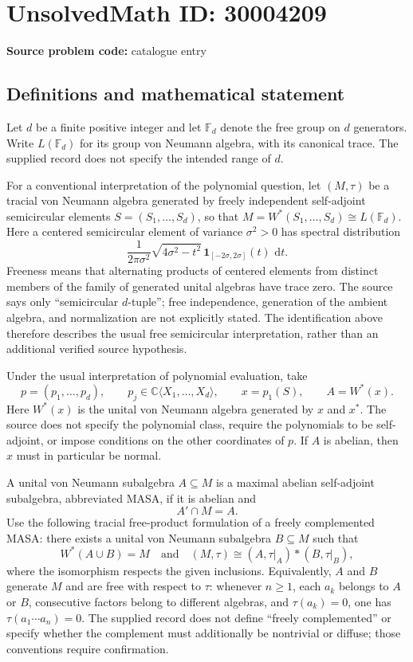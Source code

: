 \documentclass[11pt]{article}
\newcommand{\C}{\mathbb{C}}
\newcommand{\dd}{\,\mathrm{d}}
\begin{document}
\section*{UnsolvedMath ID: 30004209}
\textbf{Source problem code:} catalogue entry
\subsection{Definitions and mathematical statement}
Let \(d\) be a finite positive integer and let \(\mathbb F_d\) denote the free group on \(d\) generators. Write \(L(\mathbb F_d)\) for its group von Neumann algebra, with its canonical trace. The supplied record does not specify the intended range of \(d\).

For a conventional interpretation of the polynomial question, let \((M,\tau)\) be a tracial von Neumann algebra generated by freely independent self-adjoint semicircular elements \(S=(S_1,\ldots,S_d)\), so that \(M=W^*(S_1,\ldots,S_d)\cong L(\mathbb F_d)\). Here a centered semicircular element of variance \(\sigma^2>0\) has spectral distribution
\[
\frac{1}{2\pi\sigma^2}\sqrt{4\sigma^2-t^2}\,\mathbf 1_{[-2\sigma,2\sigma]}(t)\,\dd t.
\]
Freeness means that alternating products of centered elements from distinct members of the family of generated unital algebras have trace zero. The source says only ``semicircular \(d\)-tuple''; free independence, generation of the ambient algebra, and normalization are not explicitly stated. The identification above therefore describes the usual free semicircular interpretation, rather than an additional verified source hypothesis.

Under the usual interpretation of polynomial evaluation, take
\[
p=(p_1,\ldots,p_d),\qquad p_j\in\C\langle X_1,\ldots,X_d\rangle,
\qquad x=p_1(S),\qquad A=W^*(x).
\]
Here \(W^*(x)\) is the unital von Neumann algebra generated by \(x\) and \(x^*\). The source does not specify the polynomial class, require the polynomials to be self-adjoint, or impose conditions on the other coordinates of \(p\). If \(A\) is abelian, then \(x\) must in particular be normal.

A unital von Neumann subalgebra \(A\subseteq M\) is a maximal abelian self-adjoint subalgebra, abbreviated MASA, if it is abelian and
\[
A'\cap M=A.
\]
Use the following tracial free-product formulation of a freely complemented MASA: there exists a unital von Neumann subalgebra \(B\subseteq M\) such that
\[
W^*(A\cup B)=M
\quad\text{and}\quad
(M,\tau)\cong(A,\tau|_A)*(B,\tau|_B),
\]
where the isomorphism respects the given inclusions. Equivalently, \(A\) and \(B\) generate \(M\) and are free with respect to \(\tau\): whenever \(n\geq1\), each \(a_k\) belongs to \(A\) or \(B\), consecutive factors belong to different algebras, and \(\tau(a_k)=0\), one has \(\tau(a_1\cdots a_n)=0\). The supplied record does not define ``freely complemented'' or specify whether the complement must additionally be nontrivial or diffuse; those conventions require confirmation.
\end{document}
